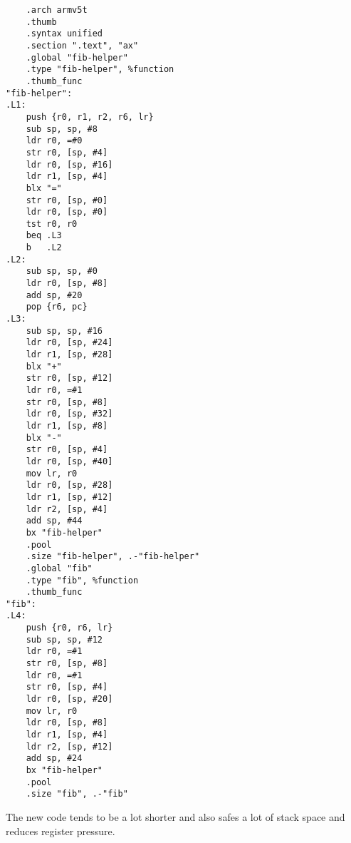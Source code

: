 \documentclass[12pt, article]{article}
\begin{document}
\begin{lstlisting}
	.arch armv5t
	.thumb
	.syntax unified
	.section ".text", "ax"
	.global "fib-helper"
	.type "fib-helper", %function
	.thumb_func
"fib-helper":
.L1:
	push {r0, r1, r2, r6, lr}
	sub sp, sp, #8
	ldr r0, =#0
	str r0, [sp, #4]
	ldr r0, [sp, #16]
	ldr r1, [sp, #4]
	blx "="
	str r0, [sp, #0]
	ldr r0, [sp, #0]
	tst r0, r0
	beq .L3
	b   .L2
.L2:
	sub sp, sp, #0
	ldr r0, [sp, #8]
	add sp, #20
	pop {r6, pc}
.L3:
	sub sp, sp, #16
	ldr r0, [sp, #24]
	ldr r1, [sp, #28]
	blx "+"
	str r0, [sp, #12]
	ldr r0, =#1
	str r0, [sp, #8]
	ldr r0, [sp, #32]
	ldr r1, [sp, #8]
	blx "-"
	str r0, [sp, #4]
	ldr r0, [sp, #40]
	mov lr, r0
	ldr r0, [sp, #28]
	ldr r1, [sp, #12]
	ldr r2, [sp, #4]
	add sp, #44
	bx "fib-helper"
	.pool
	.size "fib-helper", .-"fib-helper"
	.global "fib"
	.type "fib", %function
	.thumb_func
"fib":
.L4:
	push {r0, r6, lr}
	sub sp, sp, #12
	ldr r0, =#1
	str r0, [sp, #8]
	ldr r0, =#1
	str r0, [sp, #4]
	ldr r0, [sp, #20]
	mov lr, r0
	ldr r0, [sp, #8]
	ldr r1, [sp, #4]
	ldr r2, [sp, #12]
	add sp, #24
	bx "fib-helper"
	.pool
	.size "fib", .-"fib"
\end{lstlisting}

The new code tends to be a lot shorter and also safes a lot of stack
space and reduces register pressure.
\end{document}
